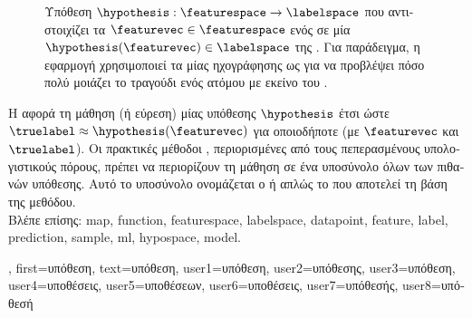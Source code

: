 {{\begin{figure}[H]
		{
		\caption{\label{fig:hypothesis_dict} \foreignlanguage{greek}{Υπόθεση $\hypothesis: \featurespace \rightarrow \labelspace$ που αντιστοιχίζει τα} 
			 $\featurevec \in \featurespace$ \foreignlanguage{greek}{ενός}  \foreignlanguage{greek}{σε μία} 
			 $\hypothesis(\featurevec) \in \labelspace$ \foreignlanguage{greek}{της} . 
			\foreignlanguage{greek}{Για παράδειγμα, η εφαρμογή}   
			\foreignlanguage{greek}{χρησιμοποιεί τα}  \foreignlanguage{greek}{μίας ηχογράφησης ως} 
			 \foreignlanguage{greek}{για να προβλέψει πόσο πολύ μοιάζει το τραγούδι ενός ατόμου με εκείνο του} 
			. } }
		\end{figure}
		\foreignlanguage{greek}{Η}  \foreignlanguage{greek}{αφορά τη μάθηση (ή εύρεση) μίας}  
		\foreignlanguage{greek}{υπόθεσης $\hypothesis$ έτσι ώστε $\truelabel \approx \hypothesis(\featurevec)$ 
		για οποιοδήποτε}  \foreignlanguage{greek}{(με}  $\featurevec$ 
		\foreignlanguage{greek}{και}  $\truelabel$). \foreignlanguage{greek}{Οι πρακτικές μέθοδοι} , 
		\foreignlanguage{greek}{περιορισμένες από τους πεπερασμένους υπολογιστικούς πόρους, πρέπει να περιορίζουν τη μάθηση σε ένα 
		υποσύνολο όλων των πιθανών}  \foreignlanguage{greek}{υπόθεσης. Αυτό το υποσύνολο ονομάζεται ο} 
		 \foreignlanguage{greek}{ή απλώς το}  \foreignlanguage{greek}{που αποτελεί τη βάση της μεθόδου.} 
		\\
		\foreignlanguage{greek}{Βλέπε επίσης:} \gls{map}, \gls{function}, \gls{featurespace}, \gls{labelspace}, \gls{datapoint}, \gls{feature}, 
		\gls{label}, \gls{prediction}, \gls{sample}, \gls{ml}, \gls{hypospace}, \gls{model}.},
	first={\foreignlanguage{greek}{υπόθεση}},
	text={\foreignlanguage{greek}{υπόθεση}},
	user1={\foreignlanguage{greek}{υπόθεση}}, %
	user2={\foreignlanguage{greek}{υπόθεσης}}, %
	user3={\foreignlanguage{greek}{υπόθεση}}, %
	user4={\foreignlanguage{greek}{υποθέσεις}}, %
	user5={\foreignlanguage{greek}{υποθέσεων}}, %
	user6={\foreignlanguage{greek}{υποθέσεις}}, %
	user7={\foreignlanguage{greek}{υπόθεσής}}, %
	user8={\foreignlanguage{greek}{υπόθεσή}} %
}

